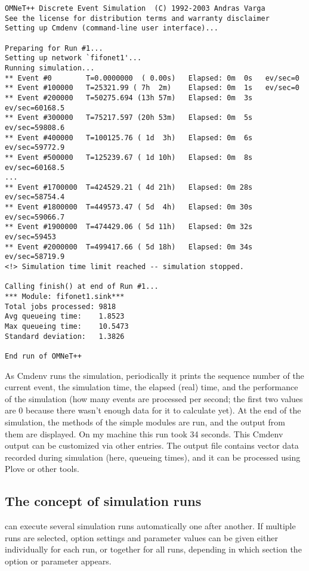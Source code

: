 \begin{verbatim}
OMNeT++ Discrete Event Simulation  (C) 1992-2003 Andras Varga
See the license for distribution terms and warranty disclaimer
Setting up Cmdenv (command-line user interface)...

Preparing for Run #1...
Setting up network `fifonet1'...
Running simulation...
** Event #0        T=0.0000000  ( 0.00s)   Elapsed: 0m  0s   ev/sec=0
** Event #100000   T=25321.99 ( 7h  2m)    Elapsed: 0m  1s   ev/sec=0
** Event #200000   T=50275.694 (13h 57m)   Elapsed: 0m  3s   ev/sec=60168.5
** Event #300000   T=75217.597 (20h 53m)   Elapsed: 0m  5s   ev/sec=59808.6
** Event #400000   T=100125.76 ( 1d  3h)   Elapsed: 0m  6s   ev/sec=59772.9
** Event #500000   T=125239.67 ( 1d 10h)   Elapsed: 0m  8s   ev/sec=60168.5
...
** Event #1700000  T=424529.21 ( 4d 21h)   Elapsed: 0m 28s   ev/sec=58754.4
** Event #1800000  T=449573.47 ( 5d  4h)   Elapsed: 0m 30s   ev/sec=59066.7
** Event #1900000  T=474429.06 ( 5d 11h)   Elapsed: 0m 32s   ev/sec=59453
** Event #2000000  T=499417.66 ( 5d 18h)   Elapsed: 0m 34s   ev/sec=58719.9
<!> Simulation time limit reached -- simulation stopped.

Calling finish() at end of Run #1...
*** Module: fifonet1.sink***
Total jobs processed: 9818
Avg queueing time:    1.8523
Max queueing time:    10.5473
Standard deviation:   1.3826

End run of OMNeT++
\end{verbatim}

As Cmdenv runs the simulation, periodically it prints the sequence number
of the current event, the simulation time, the elapsed (real) time,
and the performance of the simulation (how many events are processed per
second; the first two values are 0 because there wasn't enough data
for it to calculate yet). At the end of the simulation, the 
methods of the simple modules are run, and the output from them are displayed.
On my machine this run took 34 seconds. This Cmdenv output can be
customized via other  entries. The output file 
contains vector data recorded during simulation (here, queueing times),
and it can be processed using Plove or other tools.

\subsection{The concept of simulation runs}

{\opp} can execute several simulation runs automatically one after
another. If multiple runs are
selected, option settings and parameter values can be given either
individually for each run, or together for all runs, depending in
which section the option or parameter appears.

